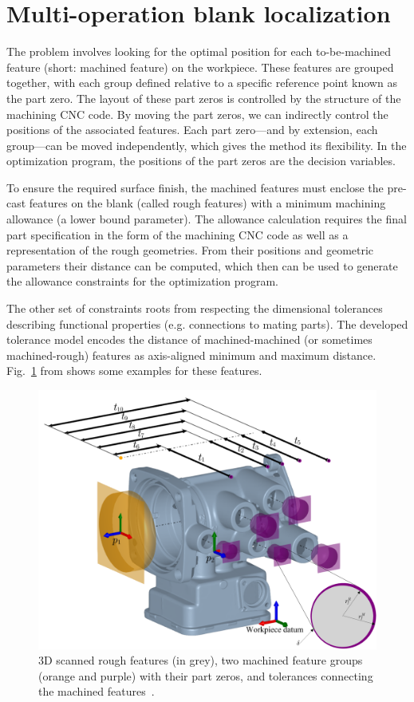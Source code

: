 \documentclass{juliacon}
\begin{document}
\section{Multi-operation blank localization}
\label{sec:algo}

The problem involves looking for the optimal position for each to-be-machined feature (short: machined feature) on the workpiece.
These features are grouped together, with each group defined relative to a specific reference point known as the part zero.
The layout of these part zeros is controlled by the structure of the machining CNC code.
By moving the part zeros, we can indirectly control the positions of the associated features.
Each part zero—and by extension, each group—can be moved independently, which gives the method its flexibility.
In the optimization program, the positions of the part zeros are the decision variables.

To ensure the required surface finish, the machined features must enclose the pre-cast features on the blank (called rough features) with a minimum machining allowance (a lower bound parameter).
The allowance calculation requires the final part specification in the form of the machining CNC code as well as a representation of the rough geometries.
From their positions and geometric parameters their distance can be computed, which then can be used to generate the allowance constraints for the optimization program.

The other set of constraints roots from respecting the dimensional tolerances describing functional properties (e.g. connections to mating parts).
The developed tolerance model encodes the distance of machined-machined (or sometimes machined-rough) features as axis-aligned minimum and maximum distance.
Fig.~\ref{fig:hatfig} from \cite{cserteg:2023_Annals} shows some examples for these features.

\begin{figure}[b]
	\centerline{\includegraphics[width=0.95\columnwidth]{cirp-annals-2023-figure-2.png}}
	\caption{3D scanned rough features (in grey), two machined feature groups (orange and purple) with their part zeros, and tolerances connecting the machined features~\cite{cserteg:2023_Annals}.}
	\label{fig:hatfig}
\end{figure}
\end{document}
